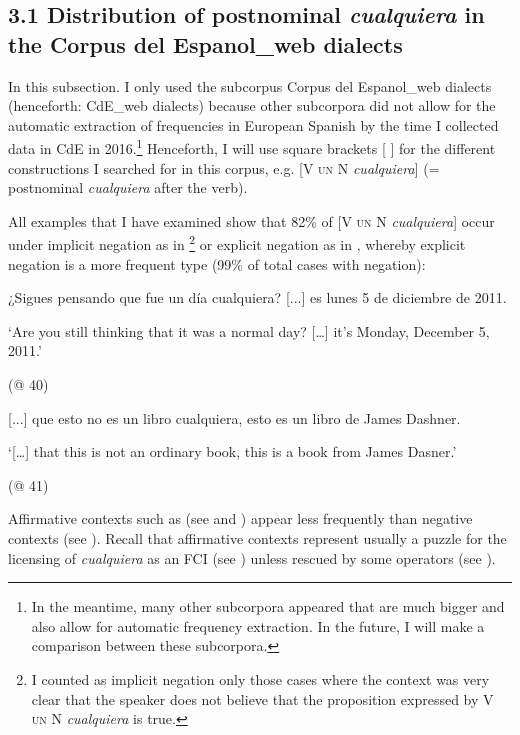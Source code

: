 \documentclass[output=paper]{langscibook}
\begin{document}
\subsection{\textbf{3.1} \textbf{Distribution} \textbf{of} \textbf{postnominal} \textbf{\textit{cualquiera} }\textbf{in} \textbf{the} \textbf{Corpus} \textbf{del} \textbf{Espanol\_web} \textbf{dialects}}

In this subsection. I only used the subcorpus Corpus del Espanol\_web dialects (henceforth: CdE\_web dialects) because other subcorpora did not allow for the automatic extraction of frequencies in European Spanish by the time I collected data in CdE in 2016.\footnote{\textrm{In the meantime, many other subcorpora appeared that are much bigger and also allow for automatic frequency extraction. In the future, I will make a comparison between these subcorpora.}} Henceforth, I will use square brackets [ ] for the different constructions I searched for in this corpus, e.g. [V \textsc{un} N \textit{cualquiera}] (= postnominal \textit{cualquiera} after the verb).

  All examples that I have examined show that 82\% of [V \textsc{un} N \textit{cualquiera}] occur under implicit negation as in \footnote{ \textrm{I counted as implicit negation only those cases where the context was very clear that the speaker does not believe that the proposition expressed by V} \textsc{un} \textrm{N} \textrm{\textit{cualquiera}} \textrm{is true.}} or explicit negation as in , whereby explicit negation is a more frequent type (99\% of total cases with negation):

\label{bkm:Ref42868256}  ¿Sigues pensando que fue un día cualquiera? [...] es lunes 5 de diciembre de 2011.

  ‘Are you still thinking that it was a normal day? […] it’s Monday, December 5, 2011.’

  (@ 40)

\label{bkm:Ref42868258}  [...] que esto no es un libro cualquiera, esto es un libro de James Dashner.

  ‘[…] that this is not an ordinary book, this is a book from James Dasner.’

  (@ 41)

Affirmative contexts such as (see  and ) appear less frequently than negative contexts (see ). Recall that affirmative contexts represent usually a puzzle for the licensing of \textit{cualquiera} as an FCI (see ) unless rescued by some operators (see ). 
\end{document}
